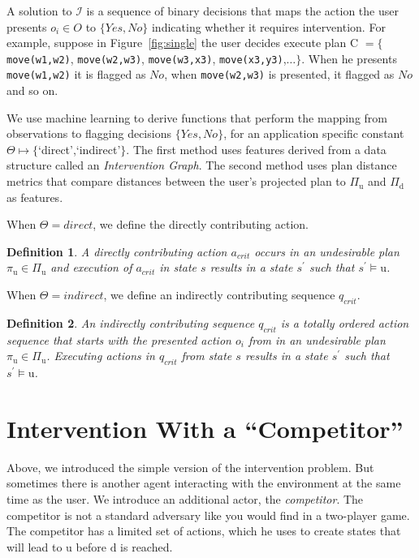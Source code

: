 \documentclass[letterpaper]{article}
\theoremstyle{plain}
\newtheorem{definition}{Definition}
\begin{document}
A solution to $\mathcal{I}$ is a sequence of binary decisions that maps the action the user presents $o_i\in O$ to $\lbrace Yes,No\rbrace$ indicating whether it requires intervention. For example, suppose in Figure~\ref{fig:single} the user decides execute plan C $=\lbrace$ \texttt{move(w1,w2)}, \texttt{move(w2,w3)}, \texttt{move(w3,x3)}, \texttt{move(x3,y3)},$\ldots \rbrace$. When he presents \texttt{move(w1,w2)} it is flagged as $No$, when \texttt{move(w2,w3)} is presented, it flagged as $No$ and so on.


We use machine learning to derive functions that perform the mapping from observations to flagging decisions $\lbrace Yes, No\rbrace$, for an application specific constant $\Theta\mapsto\lbrace$`direct',`indirect'$\rbrace$.
The first method uses features derived from a data structure called an \textit{Intervention Graph}. 
The second method uses plan distance metrics that compare distances between the user's projected plan to $\Pi_{\mathrm{u}}$ and $\Pi_{\mathrm{d}}$ as features.

When $\Theta=direct$, we define the directly contributing action.
\begin{definition}
A \textnormal{directly contributing action} $a_{crit}$ occurs in an undesirable plan $\pi_{\mathrm{u}}\in \Pi_{\mathrm{u}}$ and execution of $a_{crit}$ in state $s$ results in a state $s^\prime$ such that $s^\prime\models \mathrm{u}$.
\end{definition}
\noindent When $\Theta=indirect$, we define an indirectly contributing sequence $q_{crit}$.
\begin{definition}
An \textnormal{indirectly contributing sequence} $q_{crit}$ is a totally ordered action sequence that starts with the presented action $o_i$ from in an undesirable plan $\pi_{\mathrm{u}}\in \Pi_{\mathrm{u}}$. Executing actions in $q_{crit}$ from state $s$ results in a state $s^\prime$ such that $s^\prime\models \mathrm{u}$.
\end{definition}
\section{Intervention With a ``Competitor''}
\label{sec:example}
Above, we introduced the simple version of the intervention problem.
But sometimes there is another agent interacting with the environment at the same time as the user.
We introduce an additional actor, the \textit{competitor}. 
The competitor is not a standard adversary like you would find in a two-player game.
The competitor has a limited set of actions, which he uses to create states that will lead to $\mathrm{u}$ before $\mathrm{d}$ is reached. 
\end{document}
